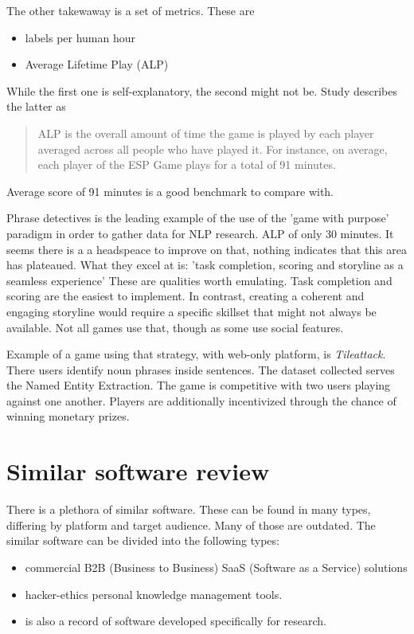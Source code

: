 \documentclass{report}
\begin{document}
The other takewaway is a set of metrics. These are
\begin{itemize}
  \item labels per human hour
  \item Average Lifetime Play (ALP)
\end{itemize}
While the first one is self-explanatory, the second might not be.
Study describes the latter as 
\begin{quote}
 ALP is the overall amount of time the game is played by each player averaged across all people who have played it. For instance, on average, each player of the ESP Game plays for a total of 91 minutes.
\end{quote}
Average score of 91 minutes is a good benchmark to compare with.

Phrase detectives \cite{poesio_phrase_2013} is the leading example of the use of the 'game with purpose' paradigm in order to gather data for NLP research.
ALP of only 30 minutes. It seems there is a a headspeace to improve on that, nothing indicates that this area has plateaued.
What they excel at is: 'task completion, scoring and storyline as a seamless experience'
These are qualities worth emulating. Task completion and scoring are the easiest to implement. 
In contrast, creating a coherent and engaging storyline would require a specific skillset that might not always be available.
Not all games use that, though as some use social features.

Example of a game using that strategy, with web-only platform, is  \textit{Tileattack}. There users identify noun phrases inside sentences. The dataset collected serves the Named Entity Extraction. The game is competitive with two users playing against one another. Players are additionally incentivized through the chance of winning monetary prizes.
\cite{noauthor_tileattack_nodate}

\section{Similar software review}
There is a plethora of similar software. These can be found in many types, differing by platform and target audience. Many of those are outdated.
The similar software can be divided into the following types:
\begin{itemize}
  \item  commercial B2B (Business to Business) SaaS (Software as a Service) solutions 
  \item  hacker-ethics personal knowledge management tools.
  \item  is also a record of software developed specifically for research.
\end{itemize}
\end{document}
